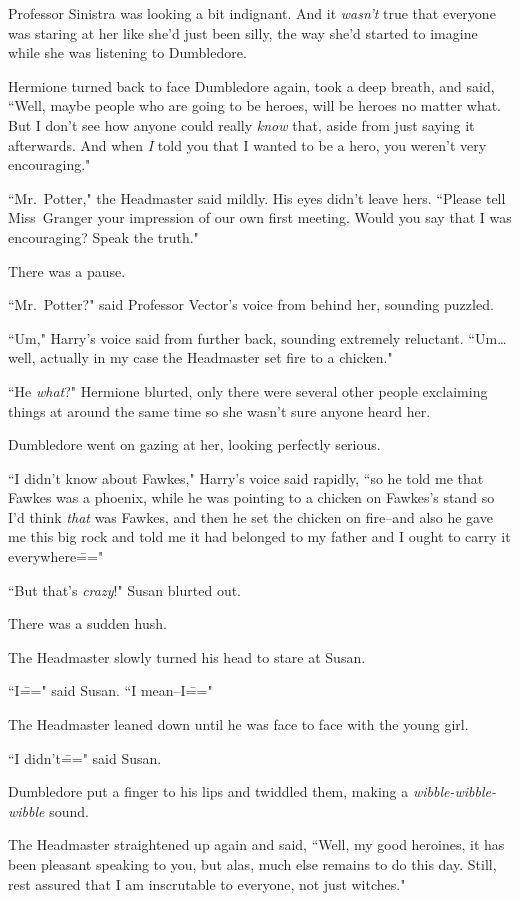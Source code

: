 Professor Sinistra was looking a bit indignant. And it \emph{wasn't} true that everyone was staring at her like she'd just been silly, the way she'd started to imagine while she was listening to Dumbledore.

Hermione turned back to face Dumbledore again, took a deep breath, and said, ``Well, maybe people who are going to be heroes, will be heroes no matter what. But I don't see how anyone could really \emph{know} that, aside from just saying it afterwards. And when \emph{I} told you that I wanted to be a hero, you weren't very encouraging."

``Mr.~Potter," the Headmaster said mildly. His eyes didn't leave hers. ``Please tell Miss~Granger your impression of our own first meeting. Would you say that I was encouraging? Speak the truth."

There was a pause.

``Mr.~Potter?" said Professor Vector's voice from behind her, sounding puzzled.

``Um," Harry's voice said from further back, sounding extremely reluctant. ``Um{\ldots} well, actually in my case the Headmaster set fire to a chicken."

``He \emph{what}?" Hermione blurted, only there were several other people exclaiming things at around the same time so she wasn't sure anyone heard her.

Dumbledore went on gazing at her, looking perfectly serious.

``I didn't know about Fawkes," Harry's voice said rapidly, ``so he told me that Fawkes was a phoenix, while he was pointing to a chicken on Fawkes's stand so I'd think \emph{that} was Fawkes, and then he set the chicken on fire\---and also he gave me this big rock and told me it had belonged to my father and I ought to carry it everywhere\==="

``But that's \emph{crazy}!" Susan blurted out.

There was a sudden hush.

The Headmaster slowly turned his head to stare at Susan.

``I\===" said Susan. ``I mean\---I\==="

The Headmaster leaned down until he was face to face with the young girl.

``I didn't\===" said Susan.

Dumbledore put a finger to his lips and twiddled them, making a \emph{wibble-wibble-wibble} sound.

The Headmaster straightened up again and said, ``Well, my good heroines, it has been pleasant speaking to you, but alas, much else remains to do this day. Still, rest assured that I am inscrutable to everyone, not just witches."

